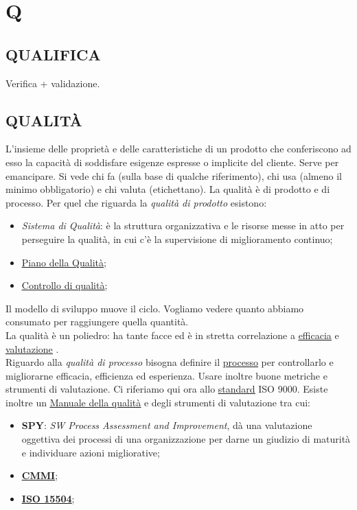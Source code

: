 \newpage
	\section{Q} \label{sec:Q}
	
		\subsection{QUALIFICA}  \label{qualifica}
		Verifica + validazione.  
	
		\subsection{QUALITÀ}  \label{qualita} %
		L’insieme delle proprietà e delle caratteristiche di un prodotto che conferiscono ad esso la capacità di soddisfare esigenze espresse o implicite del cliente. Serve per emancipare. Si vede chi fa (sulla base di qualche riferimento), chi usa (almeno il minimo obbligatorio) e chi valuta (etichettano).
		La qualità è di prodotto e di processo.
		Per quel che riguarda la \textit{qualità di prodotto} esistono:
		\begin{itemize}
			\item \textit{Sistema di Qualità}: è la struttura organizzativa e le risorse messe in atto per perseguire la qualità, in cui c'è la supervisione di miglioramento continuo;
			\item \underline{\hyperref[pianoqualita]{Piano della Qualità}};
			\item \underline{\hyperref[controlloqualita]{Controllo di qualità}};				
		\end{itemize}
		Il modello di sviluppo muove il ciclo. Vogliamo vedere quanto abbiamo consumato per raggiungere quella quantità. \\
		La qualità è un poliedro: ha tante facce ed è in stretta correlazione a \underline{\hyperref[efficacia]{efficacia}} e \underline{\hyperref[valutazione]{valutazione}} . \\
		Riguardo alla \textit{qualità di processo} bisogna definire il \underline{\hyperref[processo]{processo}} per controllarlo e migliorarne efficacia, efficienza ed esperienza. Usare inoltre buone metriche e strumenti di valutazione. Ci riferiamo qui ora allo \underline{\hyperref[standard]{standard}} ISO 9000. Esiste inoltre un \underline{\hyperref[manualequalita]{Manuale della qualità}} e degli strumenti di valutazione tra cui:
		\begin{itemize}
			\item \textbf{SPY}: \textit{SW Process Assessment and Improvement}, dà una valutazione oggettiva dei processi di una organizzazione per darne un giudizio di maturità e individuare azioni migliorative;
			\item \textbf{\underline{\hyperref[cmmi]{CMMI}}};
			\item \textbf{\underline{\hyperref[15504]{ISO 15504}}};
		\end{itemize}
	
	
